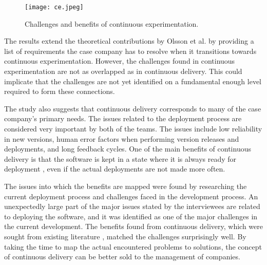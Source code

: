\documentclass[english, grading]{tktltiki2}
\theoremstyle{definition}
\theoremstyle{remark}
\begin{document}
\begin{figure}[!htb]
	\centering
	\texttt{[image: ce.jpeg]}
	\caption{Challenges and benefits of continuous experimentation.}
	\label{fig9}
\end{figure}

The results extend the theoretical contributions by Olsson et al. \cite{olsson2012climbing} by providing a list of requirements the case company has to resolve when it transitions towards continuous experimentation. However, the challenges found in continuous experimentation are not as overlapped as in continuous delivery. This could implicate that the challenges are not yet identified on a fundamental enough level required to form these connections.








The study also suggests that continuous delivery corresponds to many of the case company's primary needs. The issues related to the deployment process are considered very important by both of the teams. The issues include low reliability in new versions, human error factors when performing version releases and deployments, and long feedback cycles. One of the main benefits of continuous delivery is that the software is kept in a state where it is always ready for deployment \cite{cdbook}, even if the actual deployments are not made more often. 

The issues into which the benefits are mapped were found by researching the current deployment process and challenges faced in the development process. An unexpectedly large part of the major issues stated by the interviewees are related to deploying the software, and it was identified as one of the major challenges in the current development. The benefits found from continuous delivery, which were sought from existing literature \cite{cdbook, neely2013continuous, humble2006deployment}, matched the challenges surprisingly well. By taking the time to map the actual encountered problems to solutions, the concept of continuous delivery can be better sold to the management of companies.
\end{document}
